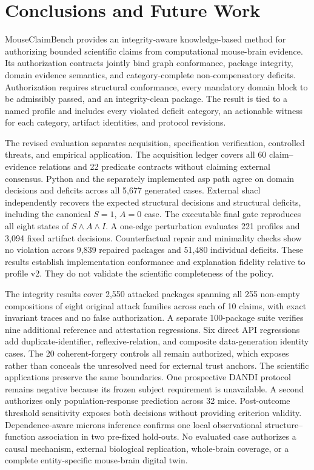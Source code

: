 \section{Conclusions and Future Work}
\label{sec:conclusions}

MouseClaimBench provides an integrity-aware knowledge-based method for authorizing bounded scientific claims from computational mouse-brain evidence. Its authorization contracts jointly bind graph conformance, package integrity, domain evidence semantics, and category-complete non-compensatory deficits. Authorization requires structural conformance, every mandatory domain block to be admissibly passed, and an integrity-clean package. The result is tied to a named profile and includes every violated deficit category, an actionable witness for each category, artifact identities, and protocol revisions.

The revised evaluation separates acquisition, specification verification, controlled threats, and empirical application. The acquisition ledger covers all 60 claim--evidence relations and 22 predicate contracts without claiming external consensus. Python and the separately implemented \ac{asp} path agree on domain decisions and deficits across all 5,677 generated cases. External \ac{shacl} independently recovers the expected structural decisions and structural deficits, including the canonical $S=1$, $A=0$ case. The executable final gate reproduces all eight states of $S\land A\land I$. A one-edge perturbation evaluates 221 profiles and 3,094 fixed artifact decisions. Counterfactual repair and minimality checks show no violation across 9,839 repaired packages and 51,480 individual deficits. These results establish implementation conformance and explanation fidelity relative to profile v2. They do not validate the scientific completeness of the policy.

The integrity results cover 2,550 attacked packages spanning all 255 non-empty compositions of eight original attack families across each of 10 claims, with exact invariant traces and no false authorization. A separate 100-package suite verifies nine additional reference and attestation regressions. Six direct API regressions add duplicate-identifier, reflexive-relation, and composite data-generation identity cases. The 20 coherent-forgery controls all remain authorized, which exposes rather than conceals the unresolved need for external trust anchors. The scientific applications preserve the same boundaries. One prospective DANDI protocol remains negative because its frozen subject requirement is unavailable. A second authorizes only population-response prediction across 32 mice. Post-outcome threshold sensitivity exposes both decisions without providing criterion validity. Dependence-aware \ac{microns} inference confirms one local observational structure--function association in two pre-fixed hold-outs. No evaluated case authorizes a causal mechanism, external biological replication, whole-brain coverage, or a complete entity-specific mouse-brain digital twin.

